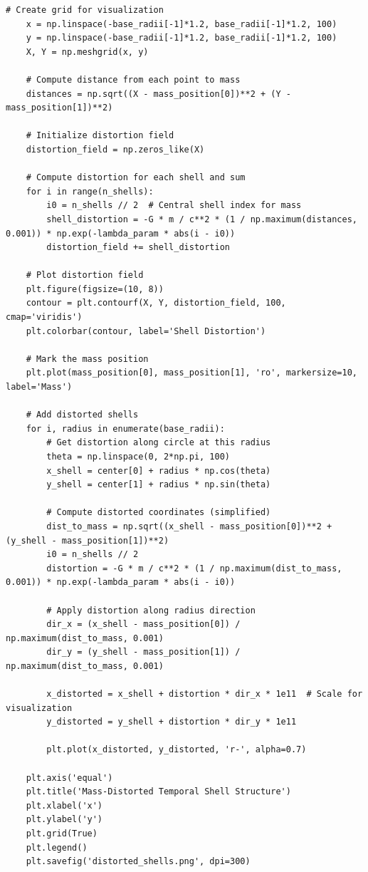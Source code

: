 \documentclass[12pt,a4paper]{article}
\begin{document}
\begin{lstlisting}[caption=Python implementation of numerical visualization of temporal shell distortion]
    # Create grid for visualization
    x = np.linspace(-base_radii[-1]*1.2, base_radii[-1]*1.2, 100)
    y = np.linspace(-base_radii[-1]*1.2, base_radii[-1]*1.2, 100)
    X, Y = np.meshgrid(x, y)
    
    # Compute distance from each point to mass
    distances = np.sqrt((X - mass_position[0])**2 + (Y - mass_position[1])**2)
    
    # Initialize distortion field
    distortion_field = np.zeros_like(X)
    
    # Compute distortion for each shell and sum
    for i in range(n_shells):
        i0 = n_shells // 2  # Central shell index for mass
        shell_distortion = -G * m / c**2 * (1 / np.maximum(distances, 0.001)) * np.exp(-lambda_param * abs(i - i0))
        distortion_field += shell_distortion
    
    # Plot distortion field
    plt.figure(figsize=(10, 8))
    contour = plt.contourf(X, Y, distortion_field, 100, cmap='viridis')
    plt.colorbar(contour, label='Shell Distortion')
    
    # Mark the mass position
    plt.plot(mass_position[0], mass_position[1], 'ro', markersize=10, label='Mass')
    
    # Add distorted shells
    for i, radius in enumerate(base_radii):
        # Get distortion along circle at this radius
        theta = np.linspace(0, 2*np.pi, 100)
        x_shell = center[0] + radius * np.cos(theta)
        y_shell = center[1] + radius * np.sin(theta)
        
        # Compute distorted coordinates (simplified)
        dist_to_mass = np.sqrt((x_shell - mass_position[0])**2 + (y_shell - mass_position[1])**2)
        i0 = n_shells // 2
        distortion = -G * m / c**2 * (1 / np.maximum(dist_to_mass, 0.001)) * np.exp(-lambda_param * abs(i - i0))
        
        # Apply distortion along radius direction
        dir_x = (x_shell - mass_position[0]) / np.maximum(dist_to_mass, 0.001)
        dir_y = (y_shell - mass_position[1]) / np.maximum(dist_to_mass, 0.001)
        
        x_distorted = x_shell + distortion * dir_x * 1e11  # Scale for visualization
        y_distorted = y_shell + distortion * dir_y * 1e11
        
        plt.plot(x_distorted, y_distorted, 'r-', alpha=0.7)
    
    plt.axis('equal')
    plt.title('Mass-Distorted Temporal Shell Structure')
    plt.xlabel('x')
    plt.ylabel('y')
    plt.grid(True)
    plt.legend()
    plt.savefig('distorted_shells.png', dpi=300)
    

\end{lstlisting}
\end{document}
